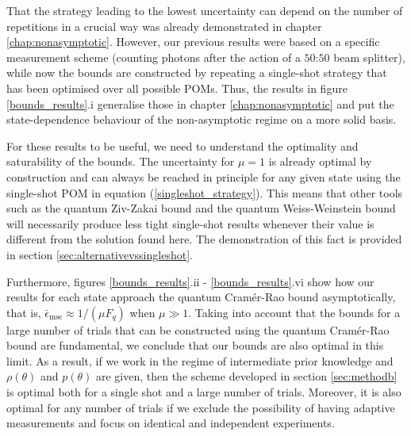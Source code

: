 That the strategy leading to the lowest uncertainty can depend on the number of repetitions in a crucial way was already demonstrated in chapter \ref{chap:nonasymptotic}. However, our previous results were based on a specific measurement scheme (counting photons after the action of a $50$:$50$ beam splitter), while now the bounds are constructed by repeating a single-shot strategy that has been optimised over all possible POMs. Thus, the results in figure \ref{bounds_results}.i generalise those in chapter \ref{chap:nonasymptotic} and put the state-dependence behaviour of the non-asymptotic regime on a more solid basis.

For these results to be useful, we need to understand the optimality and saturability of the bounds. The uncertainty for $\mu = 1$ is already optimal by construction and can always be reached in principle for any given state using the single-shot POM in equation (\ref{singleshot_strategy}). This means that other tools such as the quantum Ziv-Zakai bound \cite{tsang2012} and the quantum Weiss-Weinstein bound \cite{tsang2016} will necessarily produce less tight single-shot results whenever their value is different from the solution found here. The demonstration of this fact is provided in section \ref{sec:alternativevssingleshot}.

Furthermore, figures \ref{bounds_results}.ii - \ref{bounds_results}.vi show how our results for each state approach the quantum Cram\'{e}r-Rao bound asymptotically, that is, $\bar{\epsilon}_{\mathrm{mse}} \approx 1/(\mu F_q)$  when $\mu \gg 1$. Taking into account that the bounds for a large number of trials that can be constructed using the quantum Cram\'{e}r-Rao bound are fundamental, we conclude that our bounds are also optimal in this limit. As a result, if we work in the regime of intermediate prior knowledge and $\rho(\theta)$ and $p(\theta)$ are given, then the scheme developed in section \ref{sec:methodb} is optimal both for a single shot and a large number of trials. Moreover, it is also optimal for any number of trials if we exclude the possibility of having adaptive measurements and focus on identical and independent experiments.

